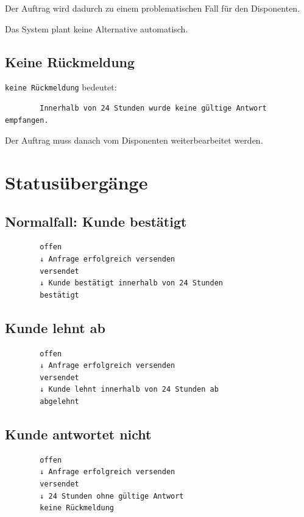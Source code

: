 \documentclass[12pt,a4paper]{article}
\begin{document}
	Der Auftrag wird dadurch zu einem problematischen Fall für den Disponenten.
	
	Das System plant keine Alternative automatisch.
	
	\subsection{Keine Rückmeldung}
	
	\texttt{keine Rückmeldung} bedeutet:
	
	\begin{lstlisting}
		Innerhalb von 24 Stunden wurde keine gültige Antwort empfangen.
	\end{lstlisting}
	
	Der Auftrag muss danach vom Disponenten weiterbearbeitet werden.
	
	\section{Statusübergänge}
	
	\subsection{Normalfall: Kunde bestätigt}
	
	\begin{lstlisting}
		offen
		↓ Anfrage erfolgreich versenden
		versendet
		↓ Kunde bestätigt innerhalb von 24 Stunden
		bestätigt
	\end{lstlisting}
	
	\subsection{Kunde lehnt ab}
	
	\begin{lstlisting}
		offen
		↓ Anfrage erfolgreich versenden
		versendet
		↓ Kunde lehnt innerhalb von 24 Stunden ab
		abgelehnt
	\end{lstlisting}
	
	\subsection{Kunde antwortet nicht}
	
	\begin{lstlisting}
		offen
		↓ Anfrage erfolgreich versenden
		versendet
		↓ 24 Stunden ohne gültige Antwort
		keine Rückmeldung
	\end{lstlisting}
	
\end{document}
